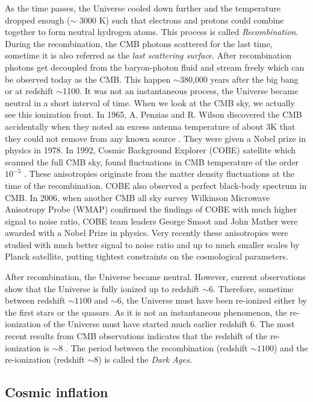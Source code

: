 As the time passes, the Universe cooled down further and the temperature
dropped enough ($\sim$ 3000 K) such that electrons and protons could combine 
together to form neutral hydrogen
atoms. This process is called {\it Recombination}. During the recombination,
the CMB photons scattered for the last time, sometime it is also referred
as the {\it last scattering surface}. After recombination photons 
get decoupled from the baryon-photon fluid and stream freely which
can be observed today as the CMB. 
This happen $\sim$380,000 years after the big bang or at redshift 
$\sim$1100. It was not an instantaneous process, the Universe became 
neutral in a short interval of time. When we look at the CMB sky, we actually see
this ionization front. In 1965, A. Penzias and R. Wilson discovered the CMB
accidentally when they noted an excess antenna temperature of about 3K that
they could not remove from any known source \citep{2006astro.ph..1514F}. 
They were given a Nobel prize in 
physics in 1978. In 1992, Cosmic Background Explorer (COBE) satellite which
scanned the full CMB sky, found fluctuations in CMB temperature of the 
order $10^{-5}$ \citep{1996ApJ...473..576F,1999AIPC..476....1S}. 
These anisotropies originate from the matter density
fluctuations at the time of the recombination. COBE also observed a perfect
black-body spectrum in CMB. In 2006, when another CMB all sky survey 
Wilkinson Microwave Anisotropy Probe (WMAP) \citep{2006PThPS.163..185K} 
confirmed the findings of COBE
with much higher signal to noise ratio, COBE team leaders George Smoot and John Mather
were awarded with a Nobel Prize in physics. Very recently these anisotropies were studied
with much better signal to noise ratio and up to much smaller scales by Planck satellite, 
putting tightest constraints on the cosmological parameters.

After recombination, the Universe became neutral. However, current observations
show that the Universe is fully ionized up to redshift $\sim 6$. Therefore, 
sometime between redshift $\sim 1100$ and $\sim 6$, the Universe must have been
re-ionized either by the first stars or the quasars. As it is not an 
instantaneous phenomenon, the re-ionization of the Universe must have
started much earlier redshift $6$. The most recent results from
CMB observations indicates that the redshift of the re-ionization is
$\sim 8$ \citep{2015arXiv150201589P}. 
The period between the recombination (redshift $\sim 1100$)
and the re-ionization (redshift $\sim 8$) is called the {\it Dark Ages}.


\subsection{Cosmic inflation}

